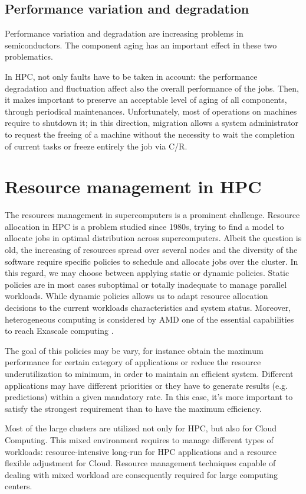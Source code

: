 \subsection{Performance variation and degradation}
Performance variation and degradation are increasing problems in
semiconductors. The component aging has an important effect in
these two problematics.

In HPC, not only faults have to be taken in account: the performance
degradation and fluctuation affect also the overall performance of the
jobs. Then, it makes important to preserve an acceptable level of aging
of all components, through periodical maintenances. Unfortunately,
most of operations on machines require to shutdown it; in this direction,
migration allows a system administrator to request the freeing of a machine
without  the necessity to wait the completion of current tasks or freeze
entirely the job via C/R.

\section{Resource management in HPC}
The resources management in supercomputers is a prominent challenge. 
Resource allocation in HPC is a problem studied since 1980s, trying to
find a model to allocate jobs in optimal distribution across supercomputers.
Albeit the question is old, the increasing of resources spread over several
nodes and the diversity of the
software require specific policies to schedule and allocate jobs over the
cluster. In this regard, we may choose between applying static or dynamic
policies. Static policies are in most cases suboptimal or totally inadequate
to manage parallel workloads. While dynamic policies allows us to adapt
resource allocation decisions to the current workloads characteristics and
system status. Moreover, heterogeneous computing
is considered by AMD one of the essential capabilities to reach
Exascale computing \cite{7155462}.

The goal of this policies may be vary, for instance obtain the maximum
performance for certain category of applications or reduce the
resource underutilization to minimum, in order to maintain an efficient system.
Different applications may have different priorities or they have to generate
results (e.g. predictions) within a given mandatory rate. In this case, it's
more important to satisfy the strongest
requirement than to have the maximum efficiency.

Most of the large clusters are utilized not only for HPC, but also for Cloud
Computing. This mixed environment requires to manage different types of
workloads: resource-intensive long-run for HPC applications and a resource
flexible adjustment for Cloud. Resource management techniques capable of
dealing with mixed workload are consequently required \cite{chen2013dynamic} for large computing centers.

